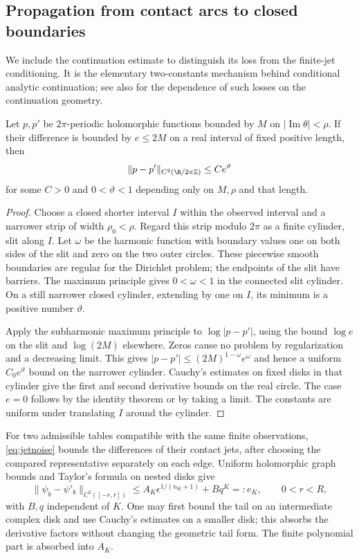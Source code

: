 \subsection{Propagation from contact arcs to closed boundaries}
We include the continuation estimate to distinguish its loss from the
finite-jet conditioning. It is the elementary two-constants mechanism
behind conditional analytic continuation; see also \cite{Trefethen}
for the dependence of such losses on the continuation geometry.

\begin{lemma}
\label{lem:continuationbound}
Let $p,p'$ be $2\pi$-periodic holomorphic functions bounded by $M$
on $|\operatorname{Im}\theta|<\rho$. If their difference is bounded
by $e\le2M$ on a real interval of fixed positive length, then
\begin{equation}\label{eq:stripstability}
 \|p-p'\|_{C^2(\R/2\pi\mathbb Z)}\le C e^{\vartheta}
\end{equation}
for some $C>0$ and $0<\vartheta<1$ depending only on $M,\rho$
and that length.
\end{lemma}
\begin{proof}
Choose a closed shorter interval $I$ within the observed interval and
a narrower strip of width $\rho_0<\rho$. Regard this strip modulo
$2\pi$ as a finite cylinder, slit along $I$. Let $\omega$ be the
harmonic function with boundary values one on both sides of the slit
and zero on the two outer circles. These piecewise smooth boundaries
are regular for the Dirichlet problem; the endpoints of the slit have
barriers. The maximum principle gives $0<\omega<1$ in the connected
slit cylinder. On a still narrower closed cylinder, extending by one
on $I$, its minimum is a positive number $\vartheta$.

Apply the subharmonic maximum principle to $\log|p-p'|$, using the
bound $\log e$ on the slit and $\log(2M)$ elsewhere. Zeros cause no
problem by regularization and a decreasing limit. This gives
$|p-p'|\le(2M)^{1-\omega}e^\omega$ and hence a uniform
$C_0e^{\vartheta}$ bound on the narrower cylinder. Cauchy's estimates
on fixed disks in that cylinder give the first and second derivative
bounds on the real circle. The case $e=0$ follows by the identity
theorem or by taking a limit. The constants are uniform under translating
$I$ around the cylinder.
\end{proof}

For two admissible tables compatible with the same finite observations,
\eqref{eq:jetnoise} bounds the differences of their contact jets, after
choosing the compared representative separately on each edge. Uniform
holomorphic graph bounds and Taylor's formula on nested disks give
\begin{equation}\label{eq:localanalyticerror}
 \|\psi_b-\psi'_b\|_{C^2([-r,r])}
       \le A_K\epsilon^{1/(n_K+1)}+Bq^K=:e_K,
                    \qquad 0<r<R,
\end{equation}
with $B,q$ independent of $K$. One may first bound the tail on an
intermediate complex disk and use Cauchy's estimates on a smaller disk;
this absorbs the derivative factors without changing the geometric
tail form. The finite polynomial part is absorbed into $A_K$.

